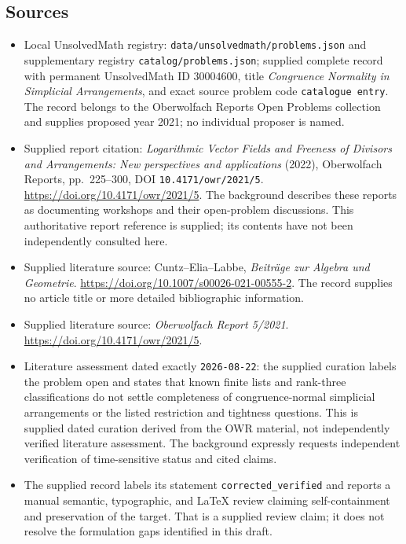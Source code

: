 \documentclass[11pt]{article}
\begin{document}
\subsection{Sources}
\begin{itemize}
\item Local UnsolvedMath registry: \texttt{data/unsolvedmath/problems.json} and supplementary registry \texttt{catalog/problems.json}; supplied complete record with permanent UnsolvedMath ID \(30004600\), title \emph{Congruence Normality in Simplicial Arrangements}, and exact source problem code \texttt{catalogue entry}. The record belongs to the Oberwolfach Reports Open Problems collection and supplies proposed year 2021; no individual proposer is named.
\item Supplied report citation: \emph{Logarithmic Vector Fields and Freeness of Divisors and Arrangements: New perspectives and applications} (2022), Oberwolfach Reports, pp.\ 225--300, DOI \texttt{10.4171/owr/2021/5}. \url{https://doi.org/10.4171/owr/2021/5}. The background describes these reports as documenting workshops and their open-problem discussions. This authoritative report reference is supplied; its contents have not been independently consulted here.
\item Supplied literature source: Cuntz--Elia--Labbe, \emph{Beitr\"age zur Algebra und Geometrie}. \url{https://doi.org/10.1007/s00026-021-00555-2}. The record supplies no article title or more detailed bibliographic information.
\item Supplied literature source: \emph{Oberwolfach Report 5/2021}. \url{https://doi.org/10.4171/owr/2021/5}.
\item Literature assessment dated exactly \texttt{2026-08-22}: the supplied curation labels the problem open and states that known finite lists and rank-three classifications do not settle completeness of congruence-normal simplicial arrangements or the listed restriction and tightness questions. This is supplied dated curation derived from the OWR material, not independently verified literature assessment. The background expressly requests independent verification of time-sensitive status and cited claims.
\item The supplied record labels its statement \texttt{corrected\_verified} and reports a manual semantic, typographic, and LaTeX review claiming self-containment and preservation of the target. That is a supplied review claim; it does not resolve the formulation gaps identified in this draft.
\end{itemize}
\end{document}
